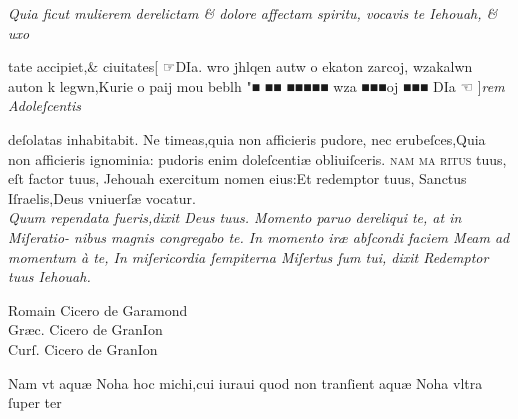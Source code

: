 \documentclass{article}
\newcommand{\threecolumntypefacenames}[3]{\begin{multicols}{3}
		\tiny
		\hfill \qquad \qquad \qquad \qquad #1\hspace*{\fill}\\
		\columnbreak
		\hfill #2\hspace*{\fill}\\
		\columnbreak
		\hfill #3\qquad \qquad \qquad \qquad \hspace*{\fill}
\end{multicols}}
\newcommand{\greektext}{\grecs wro jhlqen autw o ekaton zarcoj, wzakalwn auton k legwn,Kurie o paij mou beblh "\normalfont}
\begin{document}
{\begin{multicols}{2}
	\columnbreak
	\fontsize{8}{9}\selectfont
	\justifying
	\noindent
	\textit{Quia ficut mulierem derelictam \& dolore affectam spiritu, vocavis te Iehouah, \& uxo}
\end{multicols}
\fontsize{8}{9}\selectfont
\vspace{-2.3\baselineskip}
\noindent tate accipiet,\& ciuitates\hfill\hfill {\normalsize [ ☞}\hfill \grecs DIa. \greektext ■ ■■ ■■■■■ \grecs wza ■■■oj ■■■ DIa \normalfont \hfill{\normalsize ☜ ]}\hfill \textit{rem Adoleſcentis\linebreak}
\vspace{-2.3\baselineskip}
\begin{multicols}{2}
	\fontsize{8}{9}\selectfont
	\justifying
	\noindent deſolatas inhabitabit. Ne timeas,quia non afficieris pudore, nec erubeſces,Quia\linebreak
	non afficieris ignominia: pudoris enim doleſcenti\ae{} obliuiſceris. \textsc{nam ma\linebreak
		ritus} tuus, eſt factor tuus, Jehouah exercitum nomen eius:Et redemptor tuus,\linebreak
	Sanctus Iſraelis,Deus vniuerſ\ae{} vocatur. \\

	\columnbreak
	\fontsize{8}{9}\selectfont
	\justifying
	\noindent
	\textit{Quum rependata fueris,dixit Deus tuus. Momento paruo dereliqui te, at in Miſeratio-\linebreak
		nibus magnis congregabo te. In momento ir\ae{} abſcondi faciem {M}eam ad momentum \`a te,\linebreak
		In miſericordia ſempiterna Miſertus ſum tui, dixit Redemptor tuus Iehouah.}
\end{multicols}
\vspace{-3.5\baselineskip}
\threecolumntypefacenames{Romain Cicero de Garamond}{Gr\ae{}c. Cicero de GranIon}{Curſ. Cicero de GranIon}
\vspace{-2.5\baselineskip}
\begin{multicols}{2}
	\fontsize{7}{8}\selectfont
	\justifying
	\noindent \quad Nam vt aqu\ae{} Noha hoc michi,cui iuraui quod non tranſient aqu\ae{} Noha vltra ſuper ter\linebreak


\end{multicols}}
\end{document}
